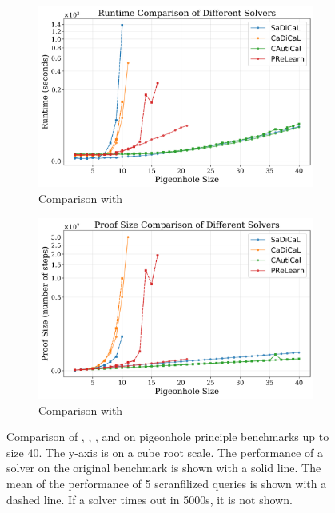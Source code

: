 \begin{figure}[!t]
    \centering
    \begin{subfigure}[t]{0.4\textwidth}
        \centering
        \includegraphics[width=\textwidth]{figs/pigeonhole_runtime_comparison.png}
        \caption{Comparison with \cadical}
        \label{fig:pigeonhole-runtime-comparison}
    \end{subfigure}
    \hspace{0.06\textwidth}
    \begin{subfigure}[t]{0.4\textwidth}
        \centering
        \includegraphics[width=\textwidth]{figs/pigeonhole_proof_size_comparison.png}
        \caption{Comparison with \prelearn}
        \label{fig:pigeonhole-proof-size-comparison}
    \end{subfigure}
    \caption{Comparison of \tool, \cadical, \sadical, and \prelearn on pigeonhole principle benchmarks up to size $40$. The y-axis is on a cube root scale. The performance of a solver on the original benchmark is shown with a solid line. The mean of the performance of 5 scranfilized queries is shown with a dashed line. If a solver times out in 5000s, it is not shown.}
    \label{fig:pigeonhole-results}
\end{figure}

